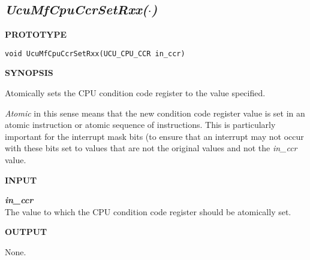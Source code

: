 \subsection[\emph{UcuMfCpuCcrSetRxx(\protect\mbox{\protect$\cdot$})}]
           {\emph{UcuMfCpuCcrSetRxx(\protect\mbox{\protect\boldmath $\cdot$})}}
\label{cmsc0:scpu0:sccs0}

%

\noindent\textbf{PROTOTYPE}
\begin {list}{}{\setlength{\leftmargin}{0.25in}\setlength{\topsep}{0.0in}}
\item
\begin{verbatim}
void UcuMfCpuCcrSetRxx(UCU_CPU_CCR in_ccr)
\end{verbatim}
\end{list}
\vspace{2.8ex}

\noindent\textbf{SYNOPSIS}
\begin{list}{}{\setlength{\leftmargin}{0.25in}\setlength{\topsep}{0.0in}}
\item Atomically sets the CPU condition code register to the value specified.
\item \emph{Atomic} in this sense means that the new condition code register
      value is set in an atomic instruction or atomic sequence of instructions.  This
      is particularly important for the interrupt mask bits (to ensure that an
      interrupt may not occur with these bits set to values that are not the original
      values and not the \emph{in\_ccr} value.
\end{list}
\vspace{2.8ex}

\noindent\textbf{INPUT}
\begin{list}{}{\setlength{\leftmargin}{0.5in}\setlength{\itemindent}{-0.25in}\setlength{\topsep}{0.0in}\setlength{\partopsep}{0.0in}}
\item \emph{\textbf{in\_ccr}}\\
      The value to which the CPU condition code register should be atomically set.
\end{list}
\vspace{2.8ex}

\noindent\textbf{OUTPUT}
\begin{list}{}{\setlength{\leftmargin}{0.25in}\setlength{\topsep}{0.0in}}
\item None.
\end{list}
\vspace{2.8ex}


